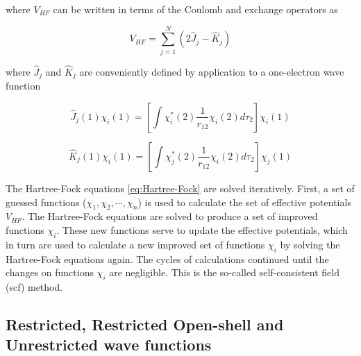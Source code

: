\begin{refsection}
\noindent where $V_{HF}$ can be written in terms of the Coulomb and exchange operators as 

\begin{equation}
V_{HF} = \sum _{j=1}^N ( 2 \hat {J} _j -  \hat {K} _j )
\end{equation}

\noindent where $\hat {J} _j$ and $ \hat {K} _j$ are conveniently defined by application to a one-electron wave function 

\begin{equation}
\hat {J}_j (1) \chi _i (1) = \left [ \int \chi ^*_i (2) \dfrac {1}{r_{12}} \chi _i (2) d \tau _2 \right ] \chi _i (1)
\end{equation}


\begin{equation}
\hat {K}_j (1) \chi _i (1) = \left [ \int \chi ^*_j (2) \dfrac {1}{r_{12}} \chi _i (2) d \tau _2 \right ] \chi _j (1)
\end{equation}

The Hartree-Fock equations \ref{eq:Hartree-Fock} are solved iteratively. First, a set of guessed functions
($\chi_1, \chi_2, \cdots, \chi_n$) is used to calculate the set of effective potentials $V_{HF}$. The Hartree-Fock equations are solved to produce a set of improved functions $\chi_i$. These new functions serve to update the effective potentials, which in turn are used to calculate a new improved set of functions $\chi_i$ by solving the Hartree-Fock equations again. The cycles of calculations continued until the changes on functions $\chi_i$ are negligible. This is the so-called self-consistent field (\acrshort{scf}) method.



\subsection{ Restricted, Restricted Open-shell and Unrestricted wave functions}


\end{refsection}
